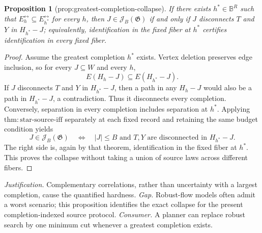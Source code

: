 \documentclass{article}
\newtheorem{proposition}{Proposition}
\begin{document}
\begin{proposition}[prop:greatest-completion-collapse]\label{prop:greatest-completion-collapse}
If there exists \(h^*\in\mathbb B^R\) such that \(E_h^{\leftrightarrow}\subseteq E_{h^*}^{\leftrightarrow}\) for every \(h\), then \(J\in\mathcal J_B(\mathfrak G)\) if and only if \(J\) disconnects \(T\) and \(Y\) in \(H_{h^*}-J\); equivalently, identification in the fixed fiber at \(h^*\) certifies identification in every fixed fiber.
\end{proposition}
\begin{proof}
Assume the greatest completion \(h^*\) exists.  Vertex deletion preserves edge inclusion, so for every \(J\subseteq W\) and every \(h\),
\[
 E(H_h-J)\subseteq E(H_{h^*}-J).
\]
If \(J\) disconnects \(T\) and \(Y\) in \(H_{h^*}-J\), then a path in any \(H_h-J\) would also be a path in \(H_{h^*}-J\), a contradiction.  Thus it disconnects every completion.  Conversely, separation in every completion includes separation at \(h^*\).  Applying \(\mathrm{thm{:}star\text{-}source\text{-}iff}\) separately at each fixed record and retaining the same budget condition yields
\[
 J\in\mathcal J_B(\mathfrak G)
 \quad\Longleftrightarrow\quad
 |J|\le B\text{ and }T,Y\text{ are disconnected in }H_{h^*}-J.
\]
The right side is, again by that theorem, identification in the fixed fiber at \(h^*\).  This proves the collapse without taking a union of source laws across different fibers.
\end{proof}
\par\smallskip\noindent \textit{Justification.} Complementary correlations, rather than uncertainty with a largest completion, cause the quantified hardness. \textit{Gap.} Robust-flow models often admit a worst scenario; this proposition identifies the exact collapse for the present completion-indexed source protocol. \textit{Consumer.} A planner can replace robust search by one minimum cut whenever a greatest completion exists.
\end{document}
